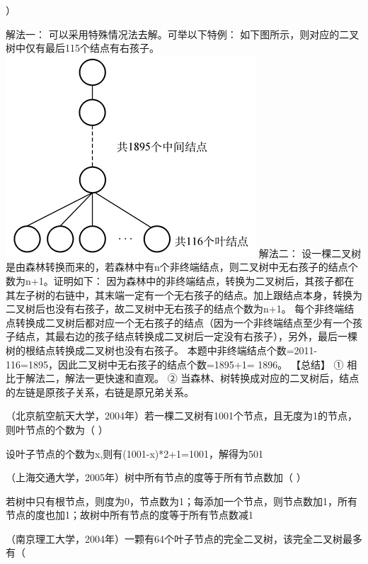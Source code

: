 ）
\par{}
\begin{solution}解法一： 可以采用特殊情况法去解。可举以下特例：
如下图所示，则对应的二叉树中仅有最后115个结点有右孩子。
\includegraphics[width=3.67708in,height=2.96875in]{computerassets/15743e12ab14bbeb49ea10ccba83edeb.jpeg}
解法二：
设一棵二叉树是由森林转换而来的，若森林中有n个非终端结点，则二叉树中无右孩子的结点个数为n+1。证明如下：
因为森林中的非终端结点，转换为二叉树后，其孩子都在其左子树的右链中，其末端一定有一个无右孩子的结点。加上跟结点本身，转换为二叉树后也没有右孩子，故二叉树中无右孩子的结点个数为n+1。
每个非终端结点转换成二叉树后都对应一个无右孩子的结点（因为一个非终端结点至少有一个孩子结点，其最右边的孩子结点转换成二叉树后一定没有右孩子），另外，最后一棵树的根结点转换成二叉树也没有右孩子。
本题中非终端结点个数=2011-116=1895，因此二叉树中无右孩子的结点个数=1895+1=
1896。 【总结】 ① 相比于解法二，解法一更快速和直观。 ②
当森林、树转换成对应的二叉树后，结点的左链是原孩子关系，右链是原兄弟关系。
\end{solution}
\question （北京航空航天大学，2004年）若一棵二叉树有1001个节点，且无度为1的节点，则叶节点的个数为（
）
\par{}
\begin{solution}设叶子节点的个数为x,则有(1001-x)*2+1=1001，解得为501
\end{solution}
\question （上海交通大学，2005年）树中所有节点的度等于所有节点数加（ ）
\par{}
\begin{solution}若树中只有根节点，则度为0，节点数为1；每添加一个节点，则节点数加1，所有节点的度也加1；故树中所有节点的度等于所有节点数减1
\end{solution}
\question （南京理工大学，2004年）一颗有64个叶子节点的完全二叉树，该完全二叉树最多有（
